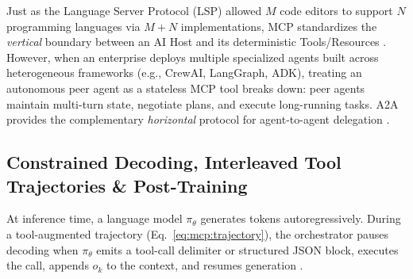 \documentclass[../../../../master.tex]{subfiles}
\begin{document}
\begin{intuition}
Just as the Language Server Protocol (LSP) allowed $M$ code editors to support $N$ programming languages via $M + N$ implementations, MCP standardizes the \emph{vertical} boundary between an AI Host and its deterministic Tools/Resources . However, when an enterprise deploys multiple specialized agents built across heterogeneous frameworks (e.g., CrewAI, LangGraph, ADK), treating an autonomous peer agent as a stateless MCP tool breaks down: peer agents maintain multi-turn state, negotiate plans, and execute long-running tasks. A2A provides the complementary \emph{horizontal} protocol for agent-to-agent delegation .
\end{intuition}

\subsection{Constrained Decoding, Interleaved Tool Trajectories \& Post-Training}

At inference time, a language model $\pi_\theta$ generates tokens autoregressively. During a tool-augmented trajectory (Eq.~\ref{eq:mcp:trajectory}), the orchestrator pauses decoding when $\pi_\theta$ emits a tool-call delimiter or structured JSON block, executes the call, appends $o_k$ to the context, and resumes generation .
\end{document}
